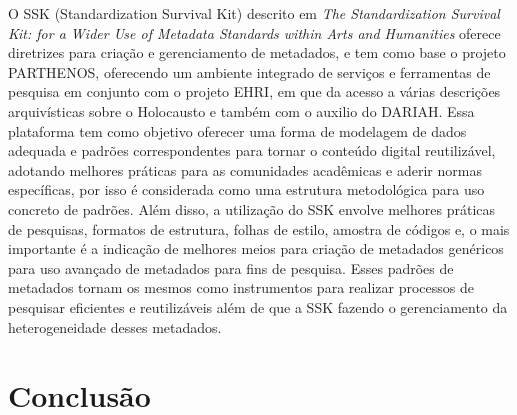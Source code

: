 \documentclass[10pt, conference, compsocconf]{IEEEtran}
\begin{document}
O SSK (Standardization Survival Kit) descrito em \textit{The Standardization Survival Kit: for a Wider Use of Metadata Standards within Arts and Humanities} oferece diretrizes para criação e gerenciamento de metadados, e tem como base o projeto PARTHENOS, oferecendo um ambiente integrado de serviços e ferramentas de pesquisa em conjunto com o projeto EHRI, em que da acesso a várias descrições arquivísticas sobre o Holocausto e também com o auxilio do DARIAH. Essa plataforma tem como objetivo oferecer uma forma de modelagem de dados adequada e padrões correspondentes para tornar o conteúdo digital reutilizável, adotando melhores práticas para as comunidades acadêmicas e aderir normas específicas, por isso é considerada como uma estrutura metodológica para uso concreto de padrões. Além disso, a utilização do SSK envolve melhores práticas de pesquisas, formatos de estrutura, folhas de estilo, amostra de códigos e, o mais importante é a indicação de melhores meios para criação de metadados genéricos para uso avançado de metadados para fins de pesquisa. Esses padrões de metadados tornam os mesmos como instrumentos para realizar processos de pesquisar eficientes e reutilizáveis além de que a SSK fazendo o gerenciamento da heterogeneidade desses metadados. \cite{riondet:hal-02124679}
 

\section{Conclusão}




%
%
%



  
\end{document}
